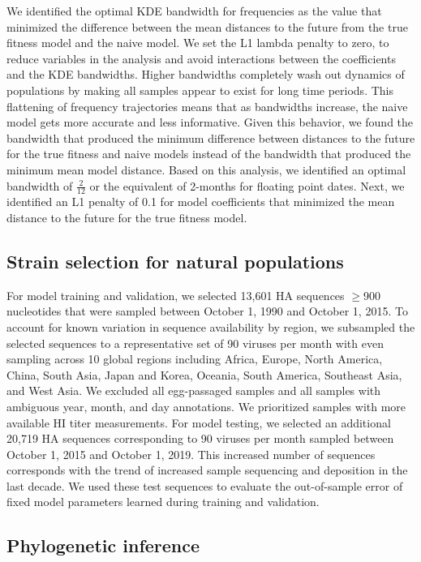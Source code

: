 We identified the optimal KDE bandwidth for frequencies as the value that minimized the difference between the mean distances to the future from the true fitness model and the naive model.
We set the L1 lambda penalty to zero, to reduce variables in the analysis and avoid interactions between the coefficients and the KDE bandwidths.
Higher bandwidths completely wash out dynamics of populations by making all samples appear to exist for long time periods.
This flattening of frequency trajectories means that as bandwidths increase, the naive model gets more accurate and less informative.
Given this behavior, we found the bandwidth that produced the minimum difference between distances to the future for the true fitness and naive models instead of the bandwidth that produced the minimum mean model distance.
Based on this analysis, we identified an optimal bandwidth of $\frac{2}{12}$ or the equivalent of 2-months for floating point dates.
Next, we identified an L1 penalty of 0.1 for model coefficients that minimized the mean distance to the future for the true fitness model.

\subsection*{Strain selection for natural populations}

For model training and validation, we selected 13,601 HA sequences $\geq$900 nucleotides that were sampled between October 1, 1990 and October 1, 2015.
To account for known variation in sequence availability by region, we subsampled the selected sequences to a representative set of 90 viruses per month with even sampling across 10 global regions including Africa, Europe, North America, China, South Asia, Japan and Korea, Oceania, South America, Southeast Asia, and West Asia.
We excluded all egg-passaged samples and all samples with ambiguous year, month, and day annotations.
We prioritized samples with more available HI titer measurements.
For model testing, we selected an additional 20,719 HA sequences corresponding to 90 viruses per month sampled between October 1, 2015 and October 1, 2019.
This increased number of sequences corresponds with the trend of increased sample sequencing and deposition in the last decade.
We used these test sequences to evaluate the out-of-sample error of fixed model parameters learned during training and validation.

\subsection*{Phylogenetic inference}

